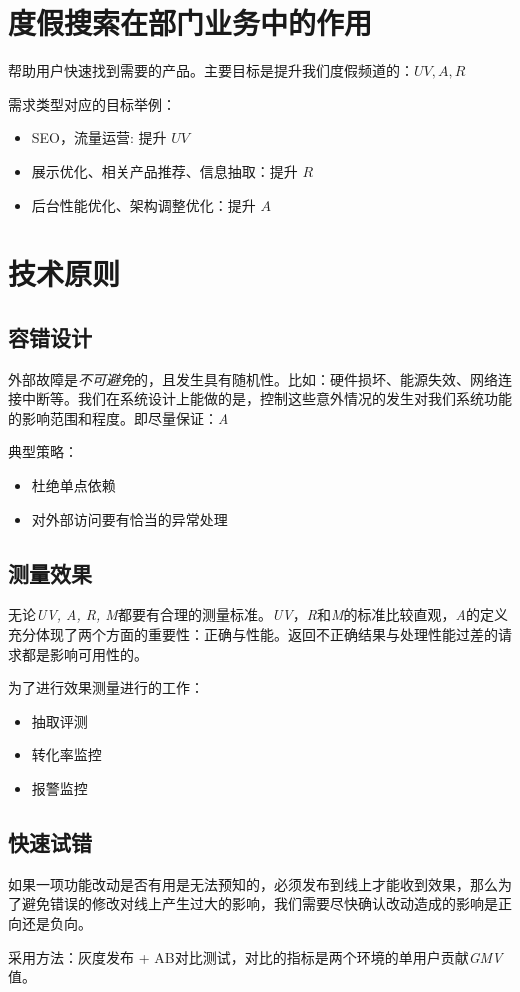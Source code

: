 \documentclass{report}
\begin{document}
\begin{CJK}{UTF8}{gbsn}
\chapter{度假搜索在部门业务中的作用}

帮助用户快速找到需要的产品。主要目标是提升我们度假频道的：$ UV, A, R $

需求类型对应的目标举例：

\begin{itemize}
  \item { SEO，流量运营: 提升 $ UV $ }
  \item { 展示优化、相关产品推荐、信息抽取：提升 $ R $ }
  \item { 后台性能优化、架构调整优化：提升 $ A $ }
\end{itemize}

\chapter{技术原则}

\section{容错设计}

外部故障是\emph{不可避免}的，且发生具有随机性。比如：硬件损坏、能源失效、网络连接中断等。我们在系统设计上能做的是，控制这些意外情况的发生对我们系统功能的影响范围和程度。即尽量保证：\emph{A}

典型策略：

\begin{itemize}
  \item { 杜绝单点依赖 }
  \item { 对外部访问要有恰当的异常处理 }
\end{itemize}

\section{测量效果}

无论\emph{UV, A, R, M}都要有合理的测量标准。\emph{UV}，\emph{R}和\emph{M}的标准比较直观，\emph{A}的定义充分体现了两个方面的重要性：正确与性能。返回不正确结果与处理性能过差的请求都是影响可用性的。

为了进行效果测量进行的工作：

\begin{itemize}
  \item { 抽取评测 }
  \item { 转化率监控 }
  \item { 报警监控 }
\end{itemize}

\section{快速试错}

如果一项功能改动是否有用是无法预知的，必须发布到线上才能收到效果，那么为了避免错误的修改对线上产生过大的影响，我们需要尽快确认改动造成的影响是正向还是负向。

采用方法：灰度发布 + AB对比测试，对比的指标是两个环境的单用户贡献\emph{GMV}值。



\clearpage
\end{CJK}
\end{document}
